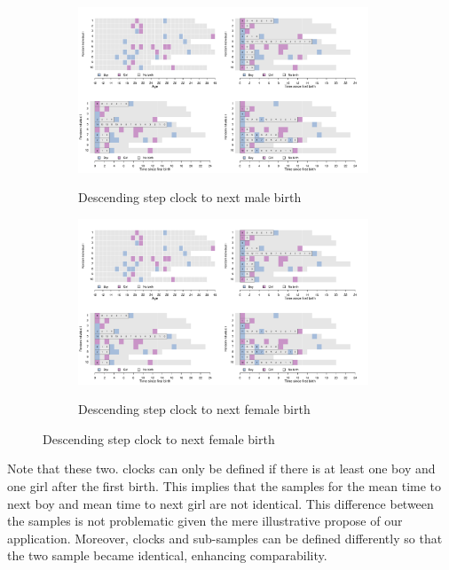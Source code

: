 \documentclass{article}
\begin{document}
\begin{figure}[H]
   \begin{subfigure}{\textwidth}
      \centering
   \includegraphics[trim=0cm 0cm 17.6cm 10cm, clip, width=0.95\textwidth]{Spells/Figures/colombia/illu_fertility.pdf}\\
    \caption{Descending step clock to next male birth}
    \label{fert_clockb}
    \end{subfigure}
    
       \begin{subfigure}{\textwidth}
      \centering
    \includegraphics[trim=17.4cm 0cm 0cm 10cm, clip, width=0.95\textwidth]{Spells/Figures/colombia/illu_fertility.pdf}\\
    \caption{Descending step clock to next female birth}
    \label{fert_clockg}
    \end{subfigure}
    
\end{figure}

Note that these two. clocks can only be defined if there is at least one boy and one girl after the first birth. This implies that the samples for the mean time to next boy and mean time to next girl are not identical. This difference between the samples is not problematic given the mere illustrative propose of our application. Moreover, clocks and sub-samples can be defined differently so that the two sample became identical, enhancing comparability.
\end{document}
